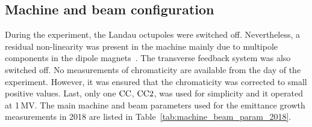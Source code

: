 \subsection{Machine and beam configuration}
During the experiment, the Landau octupoles were switched off. Nevertheless, a residual non-linearity was present in the machine mainly due to multipole components in the dipole magnets~\cite{Carlà:2664976, Alekou:2640326}. The transverse feedback system was also switched off. No measurements of chromaticity are available from the day of the experiment. However, it was ensured that the chromaticity was corrected to small positive values. Last, only one ${\mathrm{CC}}$, ${\mathrm{CC}} 2$, was used for simplicity and it operated at 1\,MV. The main machine and beam parameters used for the emittance growth measurements in 2018 are listed in Table~\ref{tab:machine_beam_param_2018}. %


